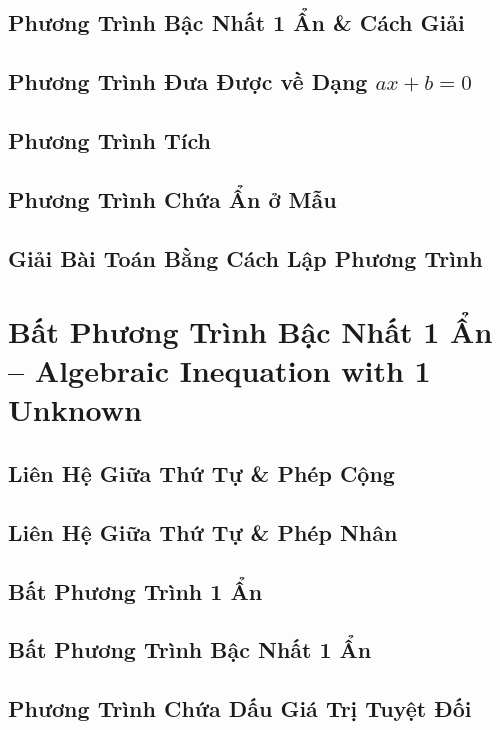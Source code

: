 \documentclass[oneside]{book}
\numberwithin{equation}{section}
\begin{document}
\section{Phương Trình Bậc Nhất 1 Ẩn \& Cách Giải}

\section{Phương Trình Đưa Được về Dạng $ax + b = 0$}

\section{Phương Trình Tích}

\section{Phương Trình Chứa Ẩn ở Mẫu}

\section{Giải Bài Toán Bằng Cách Lập Phương Trình}


\chapter{Bất Phương Trình Bậc Nhất 1 Ẩn -- Algebraic Inequation with 1 Unknown}

\section{Liên Hệ Giữa Thứ Tự \& Phép Cộng}

\section{Liên Hệ Giữa Thứ Tự \& Phép Nhân}

\section{Bất Phương Trình 1 Ẩn}

\section{Bất Phương Trình Bậc Nhất 1 Ẩn}

\section{Phương Trình Chứa Dấu Giá Trị Tuyệt Đối}
\end{document}
